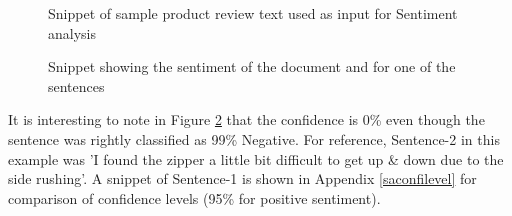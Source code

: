 \begin{itemize}
    \begin {figure}[h!h]
        \centering
        \caption{Snippet of sample product review text used as input for Sentiment analysis}
        \label{sainput}
    \end {figure}
    \begin {figure}[h!h]
        \centering
        \caption{Snippet showing the sentiment of the document and for one of the sentences}
        \label{saoutput}
    \end {figure}
    
    It is interesting to note in Figure \ref{saoutput} that the confidence is 0\% even though the sentence was rightly classified as 99\% Negative. For reference, Sentence-2 in this example was 'I found the zipper a little bit difficult to get up \& down due to the side rushing'. A snippet of Sentence-1 is shown in Appendix \ref{saconfilevel} for comparison of confidence levels (95\% for positive sentiment).
   

\end{itemize}
